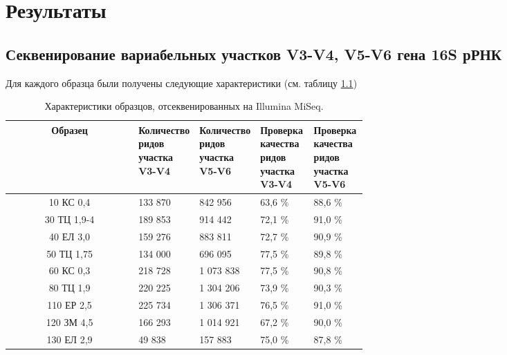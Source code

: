 \chapter{Результаты} \label{chapt2}

\section{Секвенирование вариабельных участков V3-V4, V5-V6 гена 16S рРНК} \label{sect2_1}

Для каждого образца были получены следующие характеристики (см. таблицу \ref{tab:16Sread_Ill_characteristic})

\begin{table}[H]
\caption{Характеристики образцов, отсеквенированных на Illumina MiSeq.}\label{tab:16Sread_Ill_characteristic}
\begin{center}
\begin{tabular}{|c|p{0.15\linewidth}|p{0.15\linewidth}|p{0.15\linewidth}|p{0.15\linewidth}|}
\hline
Образец & Количество ридов участка V3-V4 & Количество ридов участка V5-V6 & Проверка качества ридов участка V3-V4 & Проверка качества ридов участка V5-V6 \\
\hline
10 КС 0,4 &                                                                                                                                                                                                                                                                                                                                                                                                                                                                                                                                                                        133 870 & 842 956 & 63,6 \% & 88,6 \% \\
30 ТЦ 1,9-4 & 189 853 & 914 442 & 72,1 \% & 91,0 \% \\
40 ЕЛ 3,0 & 159 276 & 883 811 & 72,7 \% & 90,9 \% \\
50 ТЦ 1,75 & 134 000 & 696 095 & 77,5 \% & 89,8 \% \\
60 КС 0,3 & 218 728 & 1 073 838 & 77,5 \% & 90,8 \% \\
80 ТЦ 1,9 & 220 225 & 1 304 206 & 73,9 \% & 90,3 \% \\
110 ЕР 2,5 & 225 734 & 1 306 371 & 76,5 \% & 91,0 \% \\
120 ЗМ 4,5 & 166 293 & 1 014 921 & 67,2 \% & 90,0 \% \\
130 ЕЛ 2,9 & 49 838 & 157 883 & 75,0 \% & 87,8 \% \\
\hline
\end{tabular}
\end{center}
\end{table}

